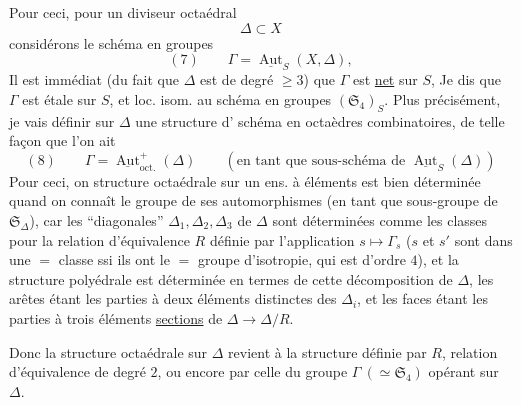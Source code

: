Pour ceci, pour un diviseur octaédral \deleted{$\unsure{\Delta}$}
\[
\Delta\subset X
\]
considérons le schéma en groupes
\[
(7)\qquad\Gamma=\underline{\operatorname{Aut}}_S(X,\Delta),
\]
Il est immédiat (du fait que $\Delta$ est de degré $\geq3$) que $\Gamma$  est \uline{net} sur $S$, Je dis que $\Gamma$ est étale sur $S$, et loc. isom. au schéma en groupes $(\mathfrak S_4)_S$. Plus précisément, je vais définir sur $\Delta$  une structure d' schéma en octaèdres combinatoires, de telle façon que l'on ait
\[
(8)\qquad\Gamma=\underline{\operatorname{Aut}}^+_{\mathrm{oct.}}(\Delta)
\qquad(\text{en tant que sous-schéma de }\underline{\operatorname{Aut}}_S(\Delta))
\]
Pour ceci, on   structure octaédrale sur un ens. à  éléments est bien déterminée quand on connaît le groupe de ses automorphismes  (en tant que sous-groupe de $\mathfrak S_\Delta$), car
les ``diagonales'' $\Delta_1,\Delta_2,\Delta_3$ de $\Delta$ sont déterminées   comme les classes pour la relation d'équivalence $R$ définie par l'application $s\longmapsto\Gamma_s$ ($s$ et $s'$ sont dans une $=$ classe ssi ils ont le $=$ groupe d'isotropie, qui est  d'ordre $4$), et la structure polyédrale est déterminée en termes de cette décomposition de $\Delta$, les arêtes étant les  parties à deux éléments distinctes des $\Delta_i$, et les  faces étant les parties à trois éléments \uline{sections} de $\Delta\longrightarrow\Delta/R$.

Donc la structure octaédrale sur $\Delta$ revient à la structure définie par $R$, relation d'équivalence de degré $2$, ou encore par celle du groupe $\Gamma\ (\simeq\mathfrak S_4)$ opérant sur $\Delta$.

